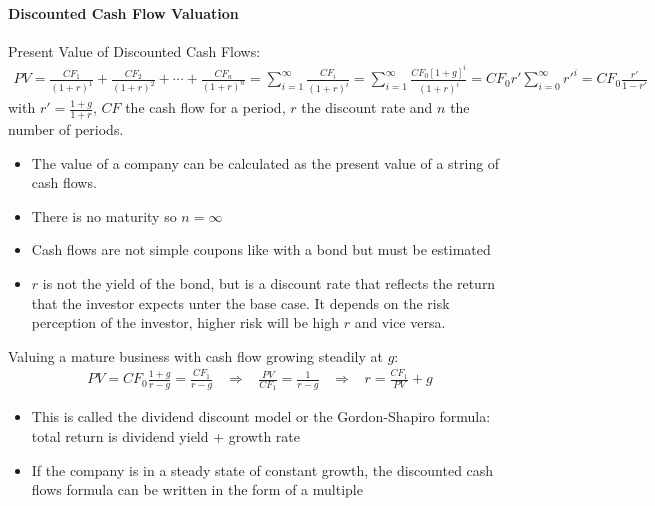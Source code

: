 \paragraph{Discounted Cash Flow Valuation}
Present Value of Discounted Cash Flows:
\begin{align*}
    PV = \frac{CF_1}{(1+r)^1} + \frac{CF_2}{(1+r)^2} + \dotsb + \frac{CF_n}{(1+r)^n}
    = \sum_{i=1}^\infty \frac{CF_i}{(1+r)^i}
    = \sum_{i=1}^\infty \frac{CF_0 [1+g]^i}{(1+r)^i}
    = CF_0 r' \sum_{i=0}^\infty r'^i
    = CF_0 \frac{r'}{1 - r'}
\end{align*}
with $r' = \frac{1+g}{1+r}$, $CF$ the cash flow for a period, $r$ the discount rate and $n$ the number of
periods.
\begin{itemize}
    \item The value of a company can be calculated as the present value of a string
        of cash flows.
    \item There is no maturity so $n = \infty$
    \item Cash flows are not simple coupons like with a bond but must be estimated
    \item $r$ is not the yield of the bond, but is a discount rate that reflects the
        return that the investor expects unter the base case. It depends on the risk
        perception of the investor, higher risk will be high $r$ and vice versa.
\end{itemize}

Valuing a mature business with cash flow growing steadily at $g$:
\begin{align*}
    PV = CF_0 \frac{1+g}{r-g} = \frac{CF_1}{r-g}
    \hspace{10pt} \Rightarrow \hspace{10pt}
    \frac{PV}{CF_1} = \frac{1}{r-g}
    \hspace{10pt} \Rightarrow \hspace{10pt}
    r = \frac{CF_1}{PV} + g
\end{align*}
\begin{itemize}
    \item This is called the dividend discount model or the Gordon-Shapiro formula:
        total return is dividend yield + growth rate
    \item If the company is in a steady state of constant growth, the discounted
        cash flows formula can be written in the form of a multiple
\end{itemize}

